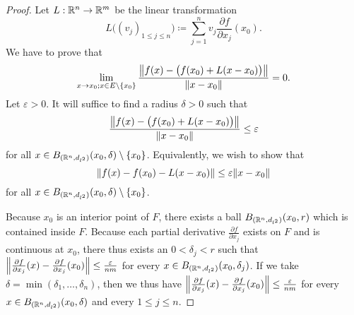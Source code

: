 \begin{proof}
  Let \(L : \R^n \to \R^m\) be the linear transformation
  \[
    L\big((v_j)_{1 \leq j \leq n}\big) \coloneqq \sum_{j = 1}^n v_j \frac{\partial f}{\partial x_j}(x_0).
  \]
  We have to prove that
  \[
    \lim_{x \to x_0 ; x \in E \setminus \{x_0\}} \frac{\norm*{f(x) - \big(f(x_0) + L(x - x_0)\big)}}{\norm*{x - x_0}} = 0.
  \]
  Let \(\varepsilon > 0\).
  It will suffice to find a radius \(\delta > 0\) such that
  \[
    \frac{\norm*{f(x) - \big(f(x_0) + L(x - x_0)\big)}}{\norm*{x - x_0}} \leq \varepsilon
  \]
  for all \(x \in B_{(\R^n, d_{l^2})}(x_0, \delta) \setminus \{x_0\}\).
  Equivalently, we wish to show that
  \[
    \norm*{f(x) - f(x_0) - L(x - x_0)} \leq \varepsilon \norm*{x - x_0}
  \]
  for all \(x \in B_{(\R^n, d_{l^2})}(x_0, \delta) \setminus \{x_0\}\).

  Because \(x_0\) is an interior point of \(F\), there exists a ball \(B_{(\R^n, d_{l^2})}(x_0, r)\) which is contained inside \(F\).
  Because each partial derivative \(\frac{\partial f}{\partial x_j}\) exists on \(F\) and is continuous at \(x_0\), there thus exists an \(0 < \delta_j < r\) such that \(\norm*{\frac{\partial f}{\partial x_j}(x) - \frac{\partial f}{\partial x_j}(x_0)} \leq \frac{\varepsilon}{nm}\) for every \(x \in B_{(\R^n, d_{l^2})}(x_0, \delta_j)\).
  If we take \(\delta = \min(\delta_1, \dots, \delta_n)\), then we thus have \(\norm*{\frac{\partial f}{\partial x_j}(x) - \frac{\partial f}{\partial x_j}(x_0)} \leq \frac{\varepsilon}{nm}\) for every \(x \in B_{(\R^n, d_{l^2})}(x_0, \delta)\) and every \(1 \leq j \leq n\).


\end{proof}
